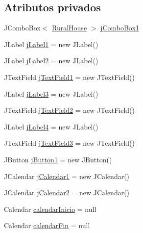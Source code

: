 \subsection*{Atributos privados}
\begin{DoxyCompactItemize}
\item 
J\+Combo\+Box$<$ \mbox{\hyperlink{classdomain_1_1_rural_house}{Rural\+House}} $>$ \mbox{\hyperlink{classgui_1_1_set_availability_g_u_i_a759205843282f8c868c459aa46c17e33}{j\+Combo\+Box1}}
\item 
J\+Label \mbox{\hyperlink{classgui_1_1_set_availability_g_u_i_a99e5f2918949b5f2a6efa15b7127efe0}{j\+Label1}} = new J\+Label()
\item 
J\+Label \mbox{\hyperlink{classgui_1_1_set_availability_g_u_i_a43fadd92c137066f726495f6de29a145}{j\+Label2}} = new J\+Label()
\item 
J\+Text\+Field \mbox{\hyperlink{classgui_1_1_set_availability_g_u_i_a6e664193569e01789e9ccc37fa132c2a}{j\+Text\+Field1}} = new J\+Text\+Field()
\item 
J\+Label \mbox{\hyperlink{classgui_1_1_set_availability_g_u_i_a260839d8134a704462036f00e61a334b}{j\+Label3}} = new J\+Label()
\item 
J\+Text\+Field \mbox{\hyperlink{classgui_1_1_set_availability_g_u_i_aa31fe6946000ac1d5a01e7beb2ed4c84}{j\+Text\+Field2}} = new J\+Text\+Field()
\item 
J\+Label \mbox{\hyperlink{classgui_1_1_set_availability_g_u_i_a6969d8917d158a3fa66153ccea58d2d5}{j\+Label4}} = new J\+Label()
\item 
J\+Text\+Field \mbox{\hyperlink{classgui_1_1_set_availability_g_u_i_a6a62e691d6ed16e056c13d321e077d00}{j\+Text\+Field3}} = new J\+Text\+Field()
\item 
J\+Button \mbox{\hyperlink{classgui_1_1_set_availability_g_u_i_ab2d139775a7efa35d9ed682e2e12f73f}{j\+Button1}} = new J\+Button()
\item 
J\+Calendar \mbox{\hyperlink{classgui_1_1_set_availability_g_u_i_a63c6223a835c93552a03023371a639c1}{j\+Calendar1}} = new J\+Calendar()
\item 
J\+Calendar \mbox{\hyperlink{classgui_1_1_set_availability_g_u_i_adb69766fbc914bb6e0fd934557e3e291}{j\+Calendar2}} = new J\+Calendar()
\item 
Calendar \mbox{\hyperlink{classgui_1_1_set_availability_g_u_i_a51ab1c21f362c9f5c76028af1378b45a}{calendar\+Inicio}} = null
\item 
Calendar \mbox{\hyperlink{classgui_1_1_set_availability_g_u_i_a5e2c23ae26a24b06dc19e8b2c9233807}{calendar\+Fin}} = null

\end{DoxyCompactItemize}
